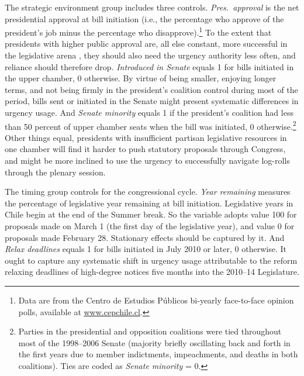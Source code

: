 \documentclass[letter,12pt]{article}
\begin{document}
The strategic environment group includes three controls. \emph{Pres.~approval} is the net presidential approval at bill initiation (i.e., the percentage who approve of the president's job minus the percentage who disapprove).\footnote{Data are from the Centro de Estudios Públicos bi-yearly face-to-face opinion polls, available at \url{www.cepchile.cl}.} To the extent that presidents with higher public approval are, all else constant, more successful in the legislative arena \citep{bond.fleisher.1990,aleman.navia.UrgChi.2009}, they should also need the urgency authority less often, and reliance should therefore drop. \emph{Introduced in Senate} equals 1 for bills initiated in the upper chamber, 0 otherwise. By virtue of being smaller, enjoying longer terms, and not being firmly in the president's coalition control during most of the period, bills sent or initiated in the Senate might present systematic differences in urgency usage. And \emph{Senate minority} equals 1 if the president's coalition had less than 50 percent of upper chamber seats when the bill was initiated, 0 otherwise.\footnote{Parties in the presidential and opposition coalitions were tied throughout most of the 1998--2006 Senate (majority briefly oscillating back and forth in the first years due to member indictments, impeachments, and deaths in both coalitions). Ties are coded as \emph{Senate minority} = 0.} Other things equal, presidents with insufficient partisan legislative resources in one chamber will find it harder to push statutory proposals through Congress, and might be more inclined to use the urgency to successfully navigate log-rolls through the plenary session.

The timing group controls for the congressional cycle. \emph{Year remaining} measures the percentage of legislative year remaining at bill initiation. Legislative years in Chile begin at the end of the Summer break. So the variable adopts value 100 for proposals made on March 1 (the first day of the legislative year), and value 0 for proposals made February 28. Stationary effects should be captured by it. And \emph{Relax deadlines} equals 1 for bills initiated in July 2010 or later, 0 otherwise. It ought to capture any systematic shift in urgency usage attributable to the reform relaxing deadlines of high-degree notices five months into the 2010--14 Legislature. 

\end{document}
